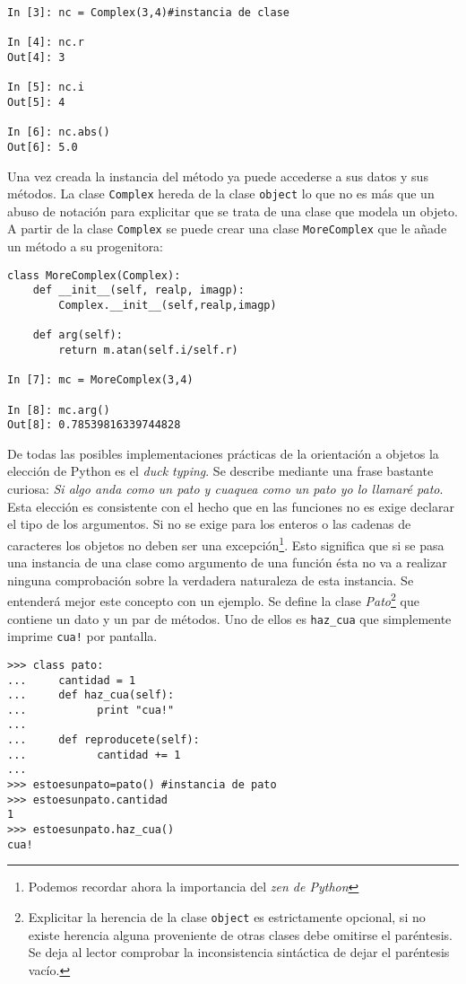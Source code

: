 \documentclass[a4paper,10pt]{article}
\begin{document}
\begin{lstlisting}
In [3]: nc = Complex(3,4)#instancia de clase

In [4]: nc.r
Out[4]: 3

In [5]: nc.i
Out[5]: 4

In [6]: nc.abs()
Out[6]: 5.0
\end{lstlisting} 

Una vez creada la instancia del método ya puede accederse a sus datos
y sus métodos.  La clase \texttt{Complex} hereda de la clase
\texttt{object} lo que no es más que un abuso de notación para
explicitar que se trata de una clase que modela un objeto.  A partir
de la clase \texttt{Complex} se puede crear una clase
\texttt{MoreComplex} que le añade un método a su progenitora:

\begin{lstlisting}
class MoreComplex(Complex):
    def __init__(self, realp, imagp):
        Complex.__init__(self,realp,imagp)

    def arg(self):
        return m.atan(self.i/self.r)

In [7]: mc = MoreComplex(3,4)

In [8]: mc.arg()
Out[8]: 0.78539816339744828
\end{lstlisting} 

De todas las posibles implementaciones prácticas de la orientación a
objetos la elección de Python es el \emph{duck typing}.  Se describe
mediante una frase bastante curiosa: \emph{Si algo anda como un pato y
  cuaquea como un pato yo lo llamaré pato}.  Esta elección es
consistente con el hecho que en las funciones no es exige declarar el
tipo de los argumentos.  Si no se exige para los enteros o las cadenas
de caracteres los objetos no deben ser una excepción\footnote{Podemos
  recordar ahora la importancia del \emph{zen de Python}}.  Esto
significa que si se pasa una instancia de una clase como argumento de
una función ésta no va a realizar ninguna comprobación sobre la
verdadera naturaleza de esta instancia.  Se entenderá mejor este
concepto con un ejemplo.  Se define la clase
\emph{Pato}\footnote{Explicitar la herencia de la clase
  \texttt{object} es estrictamente opcional, si no existe herencia
  alguna proveniente de otras clases debe omitirse el paréntesis.  Se
  deja al lector comprobar la inconsistencia sintáctica de dejar el
  paréntesis vacío.} que contiene un dato y un par de métodos. Uno de
ellos es \texttt{haz\_cua} que simplemente imprime \texttt{cua!} por
pantalla.

\begin{lstlisting}
>>> class pato:
...     cantidad = 1
...     def haz_cua(self):
...           print "cua!"
...
...     def reproducete(self):
...           cantidad += 1
...
>>> estoesunpato=pato() #instancia de pato
>>> estoesunpato.cantidad
1
>>> estoesunpato.haz_cua()
cua!
\end{lstlisting} 
\end{document}
